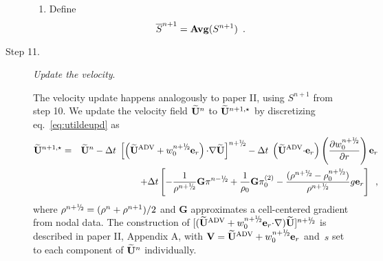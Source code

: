 \begin{description}
\begin{enumerate}
\item Define
\begin{equation}
\overline{S}^{n+1} = {\mathrm{\bf Avg}} (S^{n+1}) \enskip.
\end{equation}

\end{enumerate}


\item[Step 11.] {\em Update the velocity}.  

The velocity update happens analogously to paper II, using $S^{n+1}$ from step 10.
We update the velocity field $\widetilde{{\bf U}}^n$ to $\widetilde{{\bf U}}^{n+1,\star}$ by discretizing eq.~\ref{eq:utildeupd}
as
\begin{eqnarray}
\Ubt^{n+1,\star} &=& \Ubt^n - \dt \;
 \left[\left(\uadvtwo+ w_0^{\nph} \er\right) \cdotb \nablab \Ubt \right]^\nph
      - \dt \; \left(\uadvtwo \cdotb \er\right)  \left(\frac{\partial w_0^{\nph}}{\partial r} \right) \er \nonumber \\
   &&   + \dt \left[ - \frac{1}{\rho^\nph} {\mathbf{G}} \pi^\nmh
        + \frac{1}{\rho_0} {\mathbf{G}} \pizerotwo
        - \frac{(\rho^\nph-\rhozero^\nph)}{\rho^\nph} g \er \right] \enskip ,
\end{eqnarray}
where $\rho^\nph = ( \rho^n + \rho^{n+1} )/2$
and $\mathbf{G}$ approximates a cell-centered gradient from nodal data. 
The construction of $[(\uadvtwo+ w_0^{\nph} \er \cdotb \nablab) \Ubt ]^\nph$
is described in paper II, Appendix A, with $\Vb = \uadvtwo+w_0^{\nph} \er$ and~$s$ set to each
component of $\widetilde{{\bf U}}^n$ individually.


\end{description}
